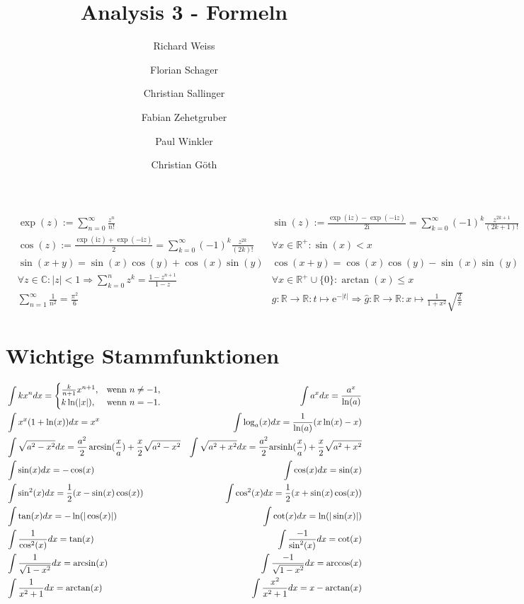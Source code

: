 \documentclass{article}
\title
{
  Analysis 3 - Formeln \\
  \vspace{4pt}
  \normalsize
  \textit{}
}
\author
{
  Richard Weiss       \and
  Florian Schager     \and
  Christian Sallinger \and
  Fabian Zehetgruber  \and
  Paul Winkler        \and
  Christian Göth
}
\date{}
\begin{document}
\maketitle

\begin{align*}
    &\exp(z) := \sum_{n=0}^\infty \frac{z^n}{n!} &  \sin(z) := \frac{\exp(\mathrm{i}z) - \exp(-\mathrm{i}z)}{2\mathrm{i}} = \sum_{k=0}^\infty (-1)^k \frac{z^{2k+1}}{(2k+1)!} \\
    &\cos(z) := \frac{\exp(\mathrm{i}z) + \exp(-\mathrm{i}z)}{2} = \sum_{k=0}^\infty (-1)^k \frac{z^{2k}}{(2k)!} &  \forall x \in \mathbb{R}^+: \sin(x) < x \\
    &\sin(x + y) = \sin(x)\cos(y) + \cos(x)\sin(y) & \cos(x + y) = \cos(x)\cos(y) - \sin(x)\sin(y) \\
    &\forall z \in \mathbb{C}: \vert z \vert < 1 \Rightarrow \sum_{k=0}^n z^k = \frac{1 - z^{n+1}}{1-z} &  \forall x \in \mathbb{R}^+\cup\{0\}: \arctan(x) \leq x \\
    &\sum_{n=1}^\infty \frac{1}{n^2} = \frac{\pi^2}{6} & g:\mathbb{R} \to \mathbb{R}: t \mapsto \mathrm{e}^{-\vert t \vert} \Rightarrow \hat{g}: \mathbb{R} \to \mathbb{R}: x \mapsto \frac{1}{1 + x^2} \sqrt{\frac{2}{\pi}}
\end{align*}
\section*{Wichtige Stammfunktionen}
\begin{align*}
  &\int kx^n dx = \begin{cases} \frac{k}{n+1}x^{n+1}, & \text{wenn } n \neq -1, \\
  k\ln (|x|), & \text{wenn } n = -1.
\end{cases}
 &\int a^x dx = \frac{a^x}{\ln (a)} \\
 &\int x^x(1+\ln(x)) dx = x^x
 &\int \log_a(x) dx = \frac{1}{\ln(a)}(x\ln(x) - x) \\
 &\int \sqrt{a^2-x^2} dx = \frac{a^2}{2}\arcsin(\frac{x}{a}) + \frac{x}{2}\sqrt{a^2-x^2}
 &\int \sqrt{a^2+x^2} dx = \frac{a^2}{2}\text{arsinh}(\frac{x}{a}) + \frac{x}{2}\sqrt{a^2+x^2} \\
 &\int \sin(x) dx = -\cos(x)
 &\int \cos(x) dx = \sin(x) \\
 &\int \sin^2(x) dx = \frac{1}{2}(x - \sin(x)\cos(x))
 &\int \cos^2(x) dx = \frac{1}{2}(x + \sin(x)\cos(x)) \\
 &\int \tan(x) dx = -\ln(|\cos(x)|)
 &\int \cot(x) dx = \ln(|\sin(x)|) \\
 &\int \frac{1}{\cos^2(x)} dx = \tan(x)
 &\int \frac{-1}{\sin^2(x)} dx = \cot(x) \\
 &\int \frac{1}{\sqrt{1-x^2}} dx = \arcsin(x)
 &\int \frac{-1}{\sqrt{1-x^2}} dx = \arccos(x) \\
 &\int \frac{1}{x^2 + 1} dx =  \arctan(x)
 &\int \frac{x^2}{x^2 + 1} dx = x - \arctan(x) \\
\end{align*}
\end{document}
